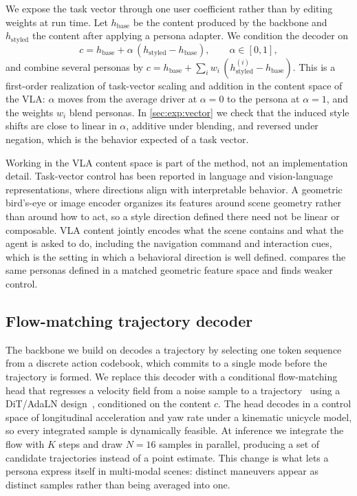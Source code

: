 We expose the task vector through one user coefficient rather than by editing
weights at run time. Let $h_{\mathrm{base}}$ be the content produced by the
backbone and $h_{\mathrm{styled}}$ the content after applying a persona adapter. We
condition the decoder on
\begin{equation}
    c = h_{\mathrm{base}} + \alpha\,(h_{\mathrm{styled}} - h_{\mathrm{base}}),
    \qquad \alpha \in [0,1],
    \label{eq:interp}
\end{equation}
and combine several personas by
$c = h_{\mathrm{base}} + \sum_i w_i\,(h^{(i)}_{\mathrm{styled}} - h_{\mathrm{base}})$.
This is a first-order realization of task-vector scaling and addition in the
content space of the VLA: $\alpha$ moves from the average driver at $\alpha{=}0$ to
the persona at $\alpha{=}1$, and the weights $w_i$ blend personas. In
\cref{sec:exp:vector} we check that the induced style shifts are close to linear in
$\alpha$, additive under blending, and reversed under negation, which is the
behavior expected of a task vector.

Working in the VLA content space is part of the method, not an implementation
detail. Task-vector control has been reported in language and vision-language
representations, where directions align with interpretable behavior. A geometric
bird's-eye or image encoder organizes its features around scene geometry rather
than around how to act, so a style direction defined there need not be linear or
composable. VLA content jointly encodes what the scene contains and what the agent
is asked to do, including the navigation command and interaction cues, which is the
setting in which a behavioral direction is well defined. 
compares the same personas defined in a matched geometric feature space and finds
weaker control.

\subsection{Flow-matching trajectory decoder}
\label{sec:method:fm}
The backbone we build on decodes a trajectory by selecting one token sequence from
a discrete action codebook, which commits to a single mode before the trajectory is
formed. We replace this decoder with a conditional flow-matching head that regresses
a velocity field from a noise sample to a trajectory~\cite{rectflow,flowmatching}
using a DiT/AdaLN design~\cite{dit}, conditioned on the content $c$. The head
decodes in a control space of longitudinal acceleration and yaw rate under a
kinematic unicycle model, so every integrated sample is dynamically feasible. At
inference we integrate the flow with $K$ steps and draw $N{=}16$ samples in
parallel, producing a set of candidate trajectories instead of a point estimate.
This change is what lets a persona express itself in multi-modal scenes: distinct
maneuvers appear as distinct samples rather than being averaged into one.

